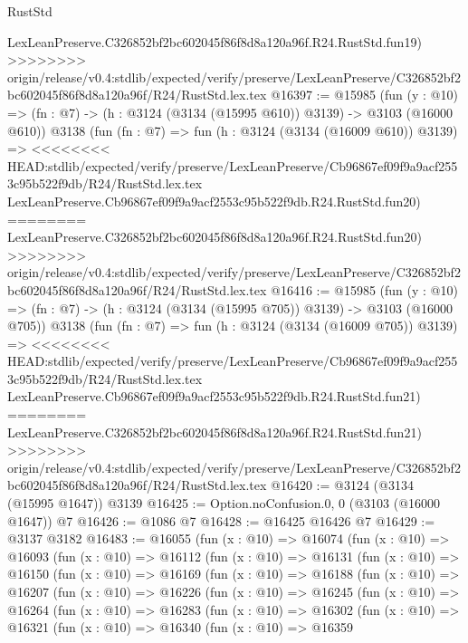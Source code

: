 \begin{lexlean}{RustStd}
\begin{coremodule}
{\begin{coremodule}
{{{{{{{{{{{{{{{{{{{{{{{{{{    LexLeanPreserve.C326852bf2bc602045f86f8d8a120a96f.R24.RustStd.fun19)
>>>>>>>> origin/release/v0.4:stdlib/expected/verify/preserve/LexLeanPreserve/C326852bf2bc602045f86f8d8a120a96f/R24/RustStd.lex.tex
@16397 := @15985
    (fun (y : @10) => (fn : @7) -> (h : @3124 (@3134 (@15995 @610)) @3139) -> @3103 (@16000 @610))
    @3138
    (fun (fn : @7) =>
    fun (h : @3124 (@3134 (@16009 @610)) @3139) =>
<<<<<<<< HEAD:stdlib/expected/verify/preserve/LexLeanPreserve/Cb96867ef09f9a9acf2553c95b522f9db/R24/RustStd.lex.tex
    LexLeanPreserve.Cb96867ef09f9a9acf2553c95b522f9db.R24.RustStd.fun20)
========
    LexLeanPreserve.C326852bf2bc602045f86f8d8a120a96f.R24.RustStd.fun20)
>>>>>>>> origin/release/v0.4:stdlib/expected/verify/preserve/LexLeanPreserve/C326852bf2bc602045f86f8d8a120a96f/R24/RustStd.lex.tex
@16416 := @15985
    (fun (y : @10) => (fn : @7) -> (h : @3124 (@3134 (@15995 @705)) @3139) -> @3103 (@16000 @705))
    @3138
    (fun (fn : @7) =>
    fun (h : @3124 (@3134 (@16009 @705)) @3139) =>
<<<<<<<< HEAD:stdlib/expected/verify/preserve/LexLeanPreserve/Cb96867ef09f9a9acf2553c95b522f9db/R24/RustStd.lex.tex
    LexLeanPreserve.Cb96867ef09f9a9acf2553c95b522f9db.R24.RustStd.fun21)
========
    LexLeanPreserve.C326852bf2bc602045f86f8d8a120a96f.R24.RustStd.fun21)
>>>>>>>> origin/release/v0.4:stdlib/expected/verify/preserve/LexLeanPreserve/C326852bf2bc602045f86f8d8a120a96f/R24/RustStd.lex.tex
@16420 := @3124 (@3134 (@15995 @1647)) @3139
@16425 := Option.noConfusion.{0, 0} (@3103 (@16000 @1647)) @7
@16426 := @1086 @7
@16428 := @16425 @16426 @7
@16429 := @3137 @3182
@16483 := @16055
    (fun (x : @10) =>
    @16074
      (fun (x : @10) =>
      @16093
        (fun (x : @10) =>
        @16112
          (fun (x : @10) =>
          @16131
            (fun (x : @10) =>
            @16150
              (fun (x : @10) =>
              @16169
                (fun (x : @10) =>
                @16188
                  (fun (x : @10) =>
                  @16207
                    (fun (x : @10) =>
                    @16226
                      (fun (x : @10) =>
                      @16245
                        (fun (x : @10) =>
                        @16264
                          (fun (x : @10) =>
                          @16283
                            (fun (x : @10) =>
                            @16302
                              (fun (x : @10) =>
                              @16321
                                (fun (x : @10) =>
                                @16340
                                  (fun (x : @10) =>
                                  @16359
}}}}}}}}}}}}}}}}}}}}}}}}}}
\end{coremodule}}
\end{coremodule}
\end{lexlean}
